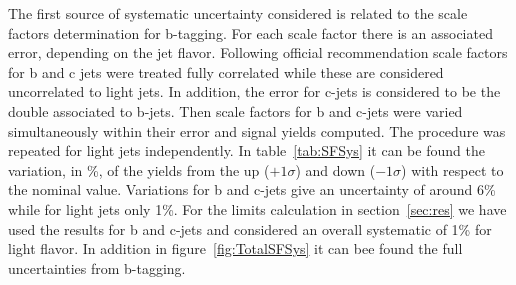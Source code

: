 The first source of systematic uncertainty considered is related to the scale factors determination for b-tagging. For each scale factor there is an associated error, depending on the jet flavor. Following official recommendation scale factors for b and c jets were treated fully correlated while these are considered uncorrelated to light jets. In addition, the error for c-jets is considered to be the double associated to b-jets. Then scale factors for b and c-jets were varied simultaneously within their error and signal yields computed. The procedure was repeated for light jets independently. In table~\ref{tab:SFSys} it can be found the variation, in \%, of the yields from the up ($+1\sigma$) and down ($-1\sigma$) with respect to the nominal value. Variations for b and c-jets give an uncertainty of around 6\% while for light jets only 1\%. For the limits calculation in section~\ref{sec:res} we have used the results for b and c-jets and considered an overall systematic of 1\% for light flavor. In addition in figure~\ref{fig:TotalSFSys} it can bee found the full uncertainties from b-tagging.

\begin{table*}[htbH]
\begin{center}
\caption{B-tagging uncertainties for signal samples\label{tab:SFSys}}
\end{center}
\end{table*}

